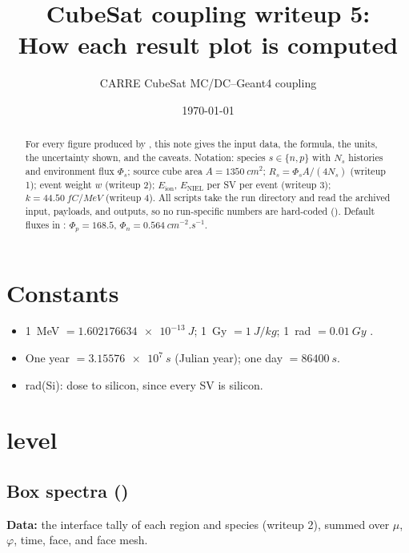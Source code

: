 

\title{CubeSat coupling writeup 5:\\How each result plot is computed}
\author{CARRE CubeSat MC/DC--Geant4 coupling}
\date{\today}


\maketitle

\begin{abstract}
For every figure produced by , this note gives the input data, the formula, the units, the uncertainty shown, and the caveats. Notation: species $s\in\{n,p\}$ with $N_s$ \mcdc{} histories and environment flux $\Phi_s$; source cube area $A=\SI{1350}{cm^2}$; $R_s=\Phi_sA/(4N_s)$ (writeup 1); \gfour{} event weight $w$ (writeup 2); $E_\text{ion}$, $E_\text{NIEL}$ per SV per event (writeup 3); $k=\SI{44.50}{fC/MeV}$ (writeup 4). All scripts take the run directory and read the archived input, payloads, and outputs, so no run-specific numbers are hard-coded (). Default fluxes in : $\Phi_p=168.5$, $\Phi_n=\SI{0.564}{cm^{-2}.s^{-1}}$.
\end{abstract}

\section{Constants}
\begin{itemize}
  \item \SI{1}{MeV} $=\SI{1.602176634e-13}{J}$; \SI{1}{Gy} $=\SI{1}{J/kg}$; \SI{1}{rad} $=\SI{0.01}{Gy}$ \citep{nist811}.
  \item One year $=\SI{3.15576e7}{s}$ (Julian year); one day $=\SI{86400}{s}$.
  \item rad(Si): dose to silicon, since every SV is silicon.
\end{itemize}

\section{\mcdc{} level}

\subsection{Box spectra ()}
\textbf{Data:} the  interface tally of each region and species (writeup 2), summed over $\mu$, $\varphi$, time, face, and face mesh.

